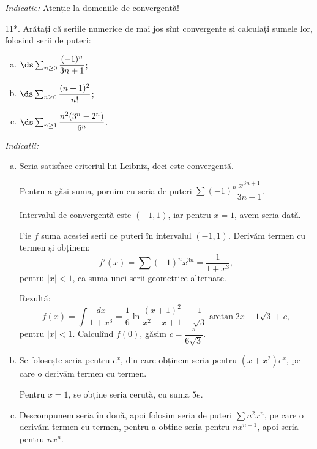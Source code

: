\emph{Indicație:} Atenție la domeniile de convergență!

\vspace{1cm}

11*. Arătați că seriile numerice de mai jos sînt convergente și calculați
sumele lor, folosind serii de puteri:
\begin{enumerate}[(a)]
\item $ \ds\sum_{n \geq 0} \dfrac{(-1)^n}{3n + 1} $;
\item $ \ds\sum_{n \geq 0} \dfrac{(n+1)^2}{n!} $;
\item $ \ds\sum_{n \geq 1} \dfrac{n^2(3^n - 2^n)}{6^n} $.
\end{enumerate}

\emph{Indicații:}
\begin{enumerate}[(a)]
\item Seria satisface criteriul lui Leibniz, deci este convergentă.

  Pentru a găsi suma, pornim cu seria de puteri $ \sum (-1)^n \dfrac{x^{3n+1}}{3n+1} $.

  Intervalul de convergență este $ (-1, 1) $, iar pentru $ x = 1 $, avem
  seria dată.

  Fie $ f $ suma acestei serii de puteri în intervalul $ (-1, 1) $. Derivăm
  termen cu termen și obținem:
  \[
    f'(x) = \sum (-1)^n x^{3n} = \frac{1}{1 + x^3},
  \]
  pentru $ |x| < 1 $, ca suma unei serii geometrice alternate.

  Rezultă:
  \[
    f(x) = \int \frac{dx}{1 + x^3} = \frac{1}{6} \ln \frac{(x + 1)^2}{x^2 - x + 1} %
    + \frac{1}{\sqrt{3}} \arctan{2x - 1}{\sqrt{3}} + c,
  \]
  pentru $ |x| < 1 $. Calculînd $ f(0) $, găsim $ c = \dfrac{\pi}{6 \sqrt{3}} $.
\item Se folosește seria pentru $ e^x $, din care obținem seria pentru
  $ (x + x^2)e^x $, pe care o derivăm termen cu termen.

  Pentru $ x = 1 $, se obține seria cerută, cu suma $ 5e $.
\item Descompunem seria în două, apoi folosim seria de puteri $ \sum n^2 x^n $,
  pe care o derivăm termen cu termen, pentru a obține seria pentru $ nx^{n-1} $,
  apoi seria pentru $ nx^n $.
\end{enumerate}




